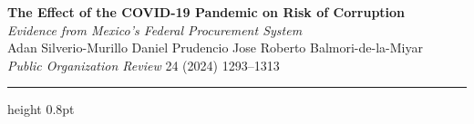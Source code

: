 \documentclass[9pt]{article}
\begin{document}
{\centering
  {\large\bfseries\color{navyblue}
    The Effect of the COVID-19 Pandemic on Risk of Corruption}\\[0.4em]
  {\small\color{steelblue}\itshape
    Evidence from Mexico's Federal Procurement System}\\[0.3em]
  {\small\color{medgray}
    Adan Silverio-Murillo \enspace Daniel Prudencio \enspace
    Jose Roberto Balmori-de-la-Miyar\\
    \textit{Public Organization Review} 24 (2024) 1293--1313}\par
}

\vspace{0.4em}
{\color{navyblue}\hrule height 0.8pt}
\vspace{0.5em}

\end{document}
